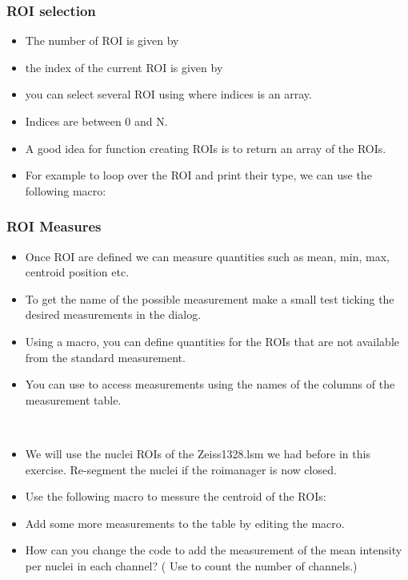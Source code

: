 \begin{frame}[fragile]
	\frametitle<presentation>{ROI selection}
	\begin{itemize}
		\item The number of ROI is given by 
		\item the index of the current ROI is given by 
		\item you can select several ROI using  where indices is an array.
		\item Indices are between 0 and N.
		\item A good idea for function creating ROIs is to return an array of the ROIs.
		\item For example to loop over the ROI and print their type, we
		can use the following macro:\par
		
	\end{itemize}
\end{frame}


\begin{frame}[fragile]
	\frametitle<presentation>{ROI Measures}
	\begin{itemize}
		\item Once ROI are defined we can measure quantities such as mean, min, max, centroid position etc.
		\item To get the name of the possible measurement make a small test ticking the desired measurements in the  dialog.
		\item Using a macro, you can define quantities for the ROIs that are not
		available from the standard measurement.
		\item You can use  to access measurements using the names
		of the columns of the measurement table.
	\end{itemize}
\end{frame}

\begin{frame}[fragile]
	\begin{example}[Measurements]~\par
		\begin{itemize}
			\item We will use the nuclei ROIs of the Zeiss1328.lsm we had before in this exercise. Re-segment the nuclei if the roimanager is now closed.
			\item Use the following macro to messure the centroid of the ROIs:\par
			
			\item Add some more measurements to the table by editing the macro.
			\item How can you change the code to add the measurement of the mean intensity per nuclei in each channel? ( Use  to count the number of channels.)
		\end{itemize}
	\end{example}
\end{frame}


